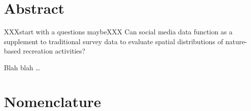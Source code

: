 



 \setcounter{tocdepth}{2}
 \tableofcontents

 \cleardoublepage





\chapter*{Abstract}
 XXXstart with a questions maybeXXX
 Can social media data function as a supplement to traditional survey data to evaluate spatial distributions of nature-based recreation activities?

Blah blah \dots

 \cleardoublepage


\chapter*{Nomenclature}\label{chap:symbole}


